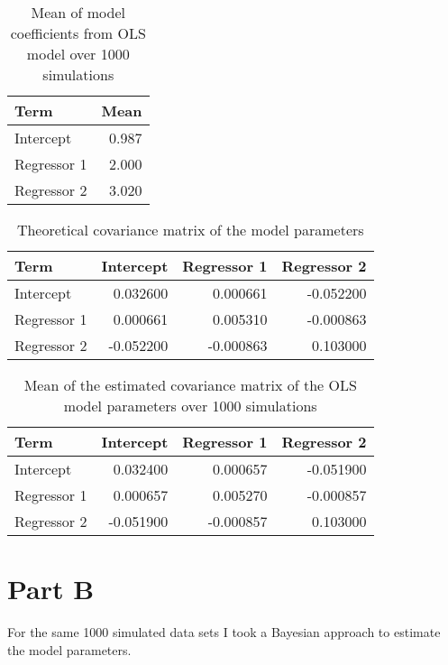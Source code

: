 \documentclass[]{book}
\begin{document}
\begin{table}

\caption{\label{tab:lm-mean-coefs-q3}Mean of model coefficients from OLS model over 1000 simulations}
\centering
\begin{tabular}[t]{lr}
\toprule
Term & Mean\\
\midrule
Intercept & 0.987\\
Regressor 1 & 2.000\\
Regressor 2 & 3.020\\
\bottomrule
\end{tabular}
\end{table}

\begin{table}

\caption{\label{tab:theory-vcov-q3}Theoretical covariance matrix of the model parameters}
\centering
\begin{tabular}[t]{lrrr}
\toprule
Term & Intercept & Regressor 1 & Regressor 2\\
\midrule
Intercept & 0.032600 & 0.000661 & -0.052200\\
Regressor 1 & 0.000661 & 0.005310 & -0.000863\\
Regressor 2 & -0.052200 & -0.000863 & 0.103000\\
\bottomrule
\end{tabular}
\end{table}

\begin{table}

\caption{\label{tab:lm-est-vcov-q3}Mean of the estimated covariance matrix of the OLS model parameters over 1000 simulations}
\centering
\begin{tabular}[t]{lrrr}
\toprule
Term & Intercept & Regressor 1 & Regressor 2\\
\midrule
Intercept & 0.032400 & 0.000657 & -0.051900\\
Regressor 1 & 0.000657 & 0.005270 & -0.000857\\
Regressor 2 & -0.051900 & -0.000857 & 0.103000\\
\bottomrule
\end{tabular}
\end{table}

\hypertarget{part-b-2}{%
\section{Part B}\label{part-b-2}}

For the same 1000 simulated data sets I took a Bayesian approach to estimate the model parameters.
\end{document}
